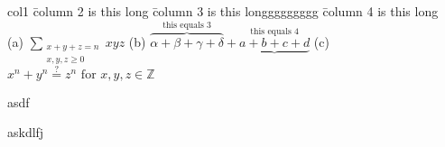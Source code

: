 \begin{tabbing}
col1 \= column 2 is this long \= column 3 is this longgggggggg \= column 4 is this long \kill \\
\> (a) $\displaystyle{\sum_{\substack{x+y+z=n \\ x,y,z\geq0}}}{xyz}$ \> (b) $\displaystyle{\overbrace{\alpha + \beta + \gamma + \delta}^{\text{this equals 3}} + \underbrace{a + b + c + d}^{\text{this equals 4}}}$ \> (c) $\displaystyle{x^n + y^n \overset{\text{?}}{=} z^n \text{ for } x, y, z \in \mathbb{Z}}$
\end{tabbing}

\begin{minipage}[t][5cm][b]{0.5\textwidth}
asdf
\end{minipage}
\begin{minipage}[t][5cm][b]{0.5\textwidth}
askdlfj
\end{minipage}

